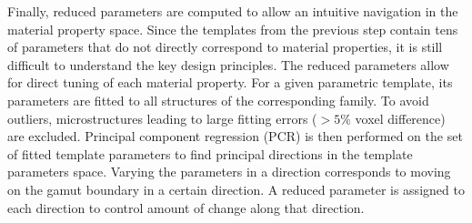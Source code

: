Finally, reduced parameters are computed to allow an intuitive navigation in the material property space. Since the templates from the previous step contain tens of parameters that do not directly correspond to material properties, it is still difficult to understand the key design principles. The reduced parameters allow for direct tuning of each material property. For a given parametric template, its parameters are fitted to all structures of the corresponding family. To avoid outliers, microstructures leading to large fitting errors ($>5\%$ voxel difference) are excluded. Principal component regression (PCR) is then performed on the set of fitted template parameters to find principal directions in the template parameters space. Varying the parameters in a direction corresponds to moving on the gamut boundary in a certain direction. A reduced parameter is assigned to each direction to control amount of change along that direction.
